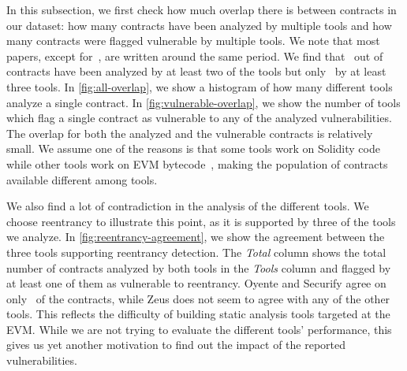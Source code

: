 
In this subsection, we first check how much overlap there is between contracts in our dataset: how many contracts have been analyzed by multiple tools and how many contracts were flagged vulnerable by multiple tools.
We note that most papers, except for~\cite{Luu2016a}, are written around the same period.
We find that~ out of~ contracts have been analyzed by at least two of the tools but only~ by at least three tools.
In \autoref{fig:all-overlap}, we show a histogram of how many different tools analyze a single contract. In \autoref{fig:vulnerable-overlap}, we show the number of tools which flag a single contract as vulnerable to any of the analyzed vulnerabilities. The overlap for both the analyzed and the vulnerable contracts is relatively small. We assume one of the reasons is that some tools work on Solidity code~\cite{DBLP:conf/ndss/KalraGDS18} while other tools work on EVM bytecode~\cite{Tsankov2018,Luu2016a}, making the population of contracts available different among tools.

We also find a lot of contradiction in the analysis of the different tools.
We choose reentrancy to illustrate this point, as it is supported by three of the tools we analyze. In \autoref{fig:reentrancy-agreement}, we show the agreement between the three tools supporting reentrancy detection. The \emph{Total} column shows the total number of contracts analyzed by both tools in the \emph{Tools} column and flagged by at least one of them as vulnerable to reentrancy. Oyente and Securify agree on only~ of the contracts, while Zeus does not seem to agree with any of the other tools.
This reflects the difficulty of building static analysis tools targeted at the EVM. While we are not trying to evaluate the different tools' performance, this gives us yet another motivation to find out the impact of the reported vulnerabilities.
